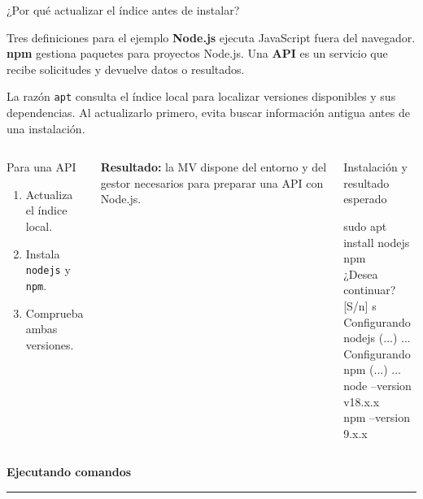 \documentclass[aspectratio=169,10pt,c]{beamer}
\begin{document}
\begin{frame}{¿Por qué actualizar el índice antes de instalar?}
\begin{block}{Tres definiciones para el ejemplo}
\small \textbf{Node.js} ejecuta JavaScript fuera del navegador. \textbf{npm} gestiona paquetes para proyectos Node.js. Una \textbf{API} es un servicio que recibe solicitudes y devuelve datos o resultados.
\end{block}
\begin{alertblock}{La razón}
\small \texttt{apt} consulta el índice local para localizar versiones disponibles y sus dependencias. Al actualizarlo primero, evita buscar información antigua antes de una instalación.
\end{alertblock}
\begin{columns}[T,onlytextwidth]
\begin{block}{Para una API}
\begin{enumerate}\small
  \item Actualiza el índice local.
  \item Instala \texttt{nodejs} y \texttt{npm}.
  \item Comprueba ambas versiones.
\end{enumerate}
\end{block}
\footnotesize\textbf{Resultado:} la MV dispone del entorno y del gestor necesarios para preparar una API con Node.js.
\begin{exampleblock}{Instalación y resultado esperado}
\begin{terminal}
\scriptsize sudo apt install nodejs npm\\
¿Desea continuar? [S/n] s\\
Configurando nodejs (...) ...\\
Configurando npm (...) ...\\
node --version\\
v18.x.x\\
npm --version\\
9.x.x
\end{terminal}
\end{exampleblock}
\end{columns}
\end{frame}

\begin{frame}[plain]
\vfill
\begin{center}
{\fontsize{29}{34}\selectfont\bfseries Ejecutando comandos}\par
\vspace{4mm}
{\color{utpRojo}\rule{8.5cm}{1.2pt}}
\end{center}
\vfill
\end{frame}
\end{document}
